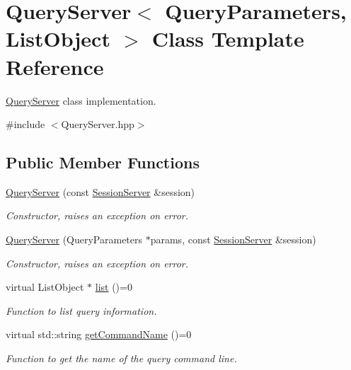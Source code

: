 \hypertarget{classQueryServer}{
\section{QueryServer$<$ QueryParameters, ListObject $>$ Class Template Reference}
\label{classQueryServer}
}


\hyperlink{classQueryServer}{QueryServer} class implementation.  




{\ttfamily \#include $<$QueryServer.hpp$>$}

\subsection*{Public Member Functions}
\begin{DoxyCompactItemize}
\item 
\hyperlink{classQueryServer_a52662d49ca1ee424c925bd2bb56067ae}{QueryServer} (const \hyperlink{classSessionServer}{SessionServer} \&session)
\begin{DoxyCompactList}\small\item\em Constructor, raises an exception on error. \item\end{DoxyCompactList}\item 
\hyperlink{classQueryServer_a17571a8b25426721f8b301cc05329ca1}{QueryServer} (QueryParameters $\ast$params, const \hyperlink{classSessionServer}{SessionServer} \&session)
\begin{DoxyCompactList}\small\item\em Constructor, raises an exception on error. \item\end{DoxyCompactList}\item 
virtual ListObject $\ast$ \hyperlink{classQueryServer_a2ad0f3f1b75e6f0705a9edbe4bab76b0}{list} ()=0
\begin{DoxyCompactList}\small\item\em Function to list query information. \item\end{DoxyCompactList}\item 
virtual std::string \hyperlink{classQueryServer_ad6b15831bd35508c3b5a393062d6e206}{getCommandName} ()=0
\begin{DoxyCompactList}\small\item\em Function to get the name of the query command line. \item\end{DoxyCompactList}\item 

\end{DoxyCompactItemize}
